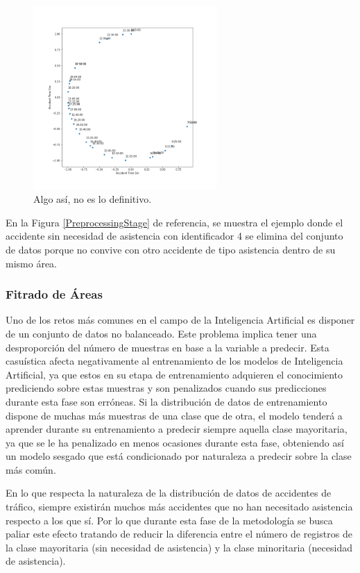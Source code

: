 \documentclass{uathesis-es}
\begin{document}
{	\begin{figure}[H]
		\centering
		\includegraphics[width=7cm]{Figures/hours.png}
		\caption{Algo así, no es lo definitivo.}
		\label{HoursPlot}
	\end{figure}
	
	En la Figura \ref{PreprocessingStage} de referencia, se muestra el ejemplo donde el accidente sin necesidad de asistencia con identificador 4 se elimina del conjunto de datos porque no convive con otro accidente de tipo asistencia dentro de su mismo área.
	
	\subsubsection{Fitrado de Áreas}
	
	Uno de los retos más comunes en el campo de la Inteligencia Artificial es disponer de un conjunto de datos no balanceado. Este problema implica tener una desproporción del número de muestras en base a la variable a predecir. Esta casuística afecta negativamente al entrenamiento de los modelos de Inteligencia Artificial, ya que estos en su etapa de entrenamiento adquieren el conocimiento prediciendo sobre estas muestras y son penalizados cuando sus predicciones durante esta fase son erróneas. Si la distribución de datos de entrenamiento dispone de muchas más muestras de una clase que de otra, el modelo tenderá a aprender durante su entrenamiento a predecir siempre aquella clase mayoritaria, ya que se le ha penalizado en menos ocasiones durante esta fase, obteniendo así un modelo sesgado que está condicionado por naturaleza a predecir sobre la clase más común.
	
	En lo que respecta la naturaleza de la distribución de datos de accidentes de tráfico, siempre existirán muchos más accidentes que no han necesitado asistencia respecto a los que sí. Por lo que durante esta fase de la metodología se busca paliar este efecto tratando de reducir la diferencia entre el número de registros de la clase mayoritaria (sin necesidad de asistencia) y la clase minoritaria (necesidad de asistencia).
	
}
\end{document}
